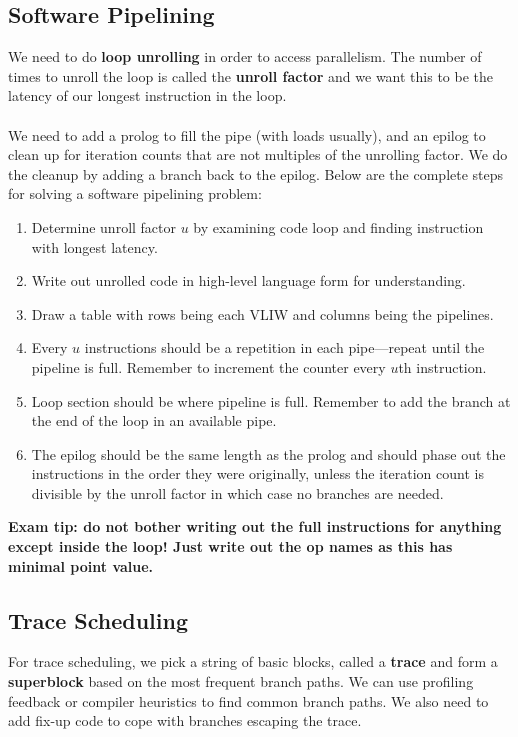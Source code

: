 \documentclass{article}
\begin{document}
\subsection{Software Pipelining}
We need to do \textbf{loop unrolling} in order to access parallelism. The number of times to unroll the loop is called the \textbf{unroll factor} and we want this to be the latency of our longest instruction in the loop. \\
\\
We need to add a prolog to fill the pipe (with loads usually), and an epilog to clean up for iteration counts that are not multiples of the unrolling factor. We do the cleanup by adding a branch back to the epilog. Below are the complete steps for solving a software pipelining problem:
\begin{enumerate}
\item Determine unroll factor $u$ by examining code loop and finding instruction with longest latency.
\item Write out unrolled code in high-level language form for understanding.
\item Draw a table with rows being each VLIW and columns being the pipelines.
\item Every $u$ instructions should be a repetition in each pipe---repeat until the pipeline is full. Remember to increment the counter every $u$th instruction.
\item Loop section should be where pipeline is full. Remember to add the branch at the end of the loop in an available pipe.
\item The epilog should be the same length as the prolog and should phase out the instructions in the order they were originally, unless the iteration count is divisible by the unroll factor in which case no branches are needed.
\end{enumerate}
\textbf{Exam tip: do not bother writing out the full instructions for anything except inside the loop! Just write out the op names as this has minimal point value.}

\subsection{Trace Scheduling}

For trace scheduling, we pick a string of basic blocks, called a \textbf{trace} and form a \textbf{superblock} based on the most frequent branch paths. We can use profiling feedback or compiler heuristics to find common branch paths. We also need to add fix-up code to cope with branches escaping the trace.
\end{document}
